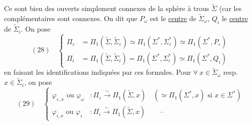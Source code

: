 Ce sont bien des ouverts  simplement connexes de la sphère à trous $\widetilde\Sigma$ (car les complémentaires  sont connexes. On dit que $P_\omega$ est le \uline{centre} de $\widetilde\Sigma_\omega$, $Q_i$ le \uline{centre} de $\widetilde\Sigma_i$.
On pose
\[
(28)\quad\left\{\begin{aligned}
\Pi_\varepsilon&=\Pi_1(\widetilde\Sigma,\widetilde\Sigma_\varepsilon)\simeq\Pi_1(\Sigma^*,\Sigma_\varepsilon^*)\simeq\Pi_1(\Sigma^*,P_\varepsilon)\\
\Pi_i&=\Pi_1(\widetilde\Sigma,\widetilde\Sigma_i)=\Pi_1(\Sigma^*,\Sigma_i^*)\simeq\Pi_1(\Sigma^*,Q_i)
\end{aligned}\right.
\]
en faisant les identifications indiquées par ces formules.  Pour $\forall\ x\in\widetilde\Sigma_\omega$ resp. $x\in\widetilde\Sigma_i$, on pose
\[
(29)\quad\left\{\begin{aligned}
\varphi_{\varepsilon,x}\text{ ou }\varphi_\omega&:\Pi_\varepsilon\xrightarrow{\sim}\Pi_1(\widetilde\Sigma,x)\quad(\simeq\Pi_1(\Sigma^*,x)\text{ si }x\in\Sigma^*)\\
\varphi_{i,x}\text{ ou }\varphi_i&:\Pi_i\xrightarrow{\sim}\Pi_1(\widetilde\Sigma,x)\qquad\text{--}
\end{aligned}\right.
\]
